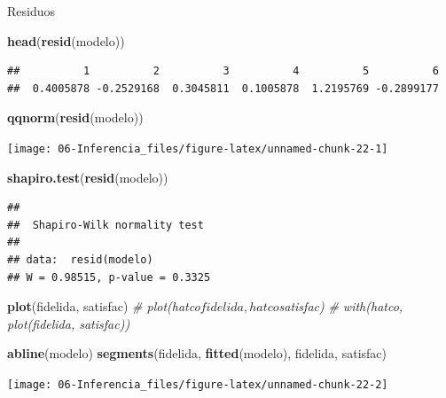 \documentclass[]{book}
\newenvironment{Shaded}{\begin{snugshade}}{\end{snugshade}}
\newcommand{\KeywordTok}[1]{\textcolor[rgb]{0.13,0.29,0.53}{\textbf{#1}}}
\newcommand{\CommentTok}[1]{\textcolor[rgb]{0.56,0.35,0.01}{\textit{#1}}}
\newcommand{\NormalTok}[1]{#1}
\begin{document}
Residuos

\begin{Shaded}
\begin{Highlighting}[]
\KeywordTok{head}\NormalTok{(}\KeywordTok{resid}\NormalTok{(modelo))}
\end{Highlighting}
\end{Shaded}

\begin{verbatim}
##          1          2          3          4          5          6 
##  0.4005878 -0.2529168  0.3045811  0.1005878  1.2195769 -0.2899177
\end{verbatim}

\begin{Shaded}
\begin{Highlighting}[]
\KeywordTok{qqnorm}\NormalTok{(}\KeywordTok{resid}\NormalTok{(modelo))}
\end{Highlighting}
\end{Shaded}

\begin{center}\texttt{[image: 06-Inferencia\_files/figure-latex/unnamed-chunk-22-1]} \end{center}

\begin{Shaded}
\begin{Highlighting}[]
\KeywordTok{shapiro.test}\NormalTok{(}\KeywordTok{resid}\NormalTok{(modelo))}
\end{Highlighting}
\end{Shaded}

\begin{verbatim}
## 
##  Shapiro-Wilk normality test
## 
## data:  resid(modelo)
## W = 0.98515, p-value = 0.3325
\end{verbatim}

\begin{Shaded}
\begin{Highlighting}[]
\KeywordTok{plot}\NormalTok{(fidelida, satisfac)}
\CommentTok{# plot(hatco$fidelida, hatco$satisfac)    }
\CommentTok{# with(hatco, plot(fidelida, satisfac))}

\KeywordTok{abline}\NormalTok{(modelo)}
\KeywordTok{segments}\NormalTok{(fidelida, }\KeywordTok{fitted}\NormalTok{(modelo), fidelida, satisfac)}
\end{Highlighting}
\end{Shaded}

\begin{center}\texttt{[image: 06-Inferencia\_files/figure-latex/unnamed-chunk-22-2]} \end{center}
\end{document}
